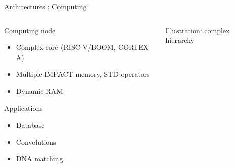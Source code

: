 %
\begin{Frame}{Architectures : Computing}
  \begin{columns}[t]
    \begin{column}{\BW} %
      \begin{block}{Computing node}
        \begin{itemize}
        \item Complex core (RISC-V/BOOM, CORTEX A)
        \item Multiple IMPACT memory, STD operators
        \item Dynamic RAM
        \end{itemize}
      \end{block}
      \begin{block}{Applications}
        \begin{itemize}
        \item Database
        \item Convolutions
        \item DNA matching
        \end{itemize}
      \end{block}
    \end{column}

    \begin{column}{\BW} %
      \begin{block}{Illustration: complex hierarchy}
      \end{block}
    \end{column}
  \end{columns}
\end{Frame}

